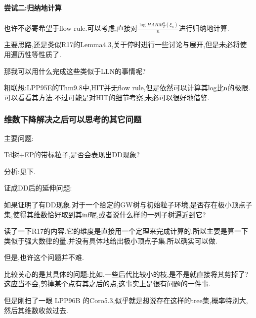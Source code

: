 \documentclass[a4paper,oneside]{ctexbook}
\begin{document}
			\paragraph*{尝试二:归纳地计算}
			\quad %

				也许不必寄希望于flow rule.可以考虑,直接对$\displaystyle\frac{\log HARM^{\eta}_T(\xi_n)}{n}$进行归纳地计算.

				主要思路,还是类似R17的Lemma4.3,关于停时进行一些讨论与展开,但是未必将使用遍历性等性质了.

				那我可以用什么完成这些类似于LLN的事情呢?

				粗联想:LPP95E的Thm9.8中,HIT并无flow rule,但是依然可以计算其log比n的极限.可以看看其方法.不过可能是对HIT的细节考察,未必可以很好地借鉴.

	
						
			\subsubsection*{维数下降解决之后可以思考的其它问题}

				主要问题:

					\begin{que}

						Td树+EP的带标粒子,是否会表现出DD现象?
					
					\end{que}

					分析:见下.					

				证成DD后的延伸问题:

					\begin{que}

						如果证明了有DD现象.对于一个给定的GW树与初始粒子环境,是否存在极小顶点子集,使得其维数恰好取到其inf呢,或者说什么样的一列子树逼近到它?
					
					\end{que}

						读了一下R17的内容.它的维度是直接用一个定理来完成计算的.所以主要是算一下类似于强大数律的量.并没有具体地给出极小顶点子集.所以确实可以做.

						但是,也许这个问题并不难.

						比较关心的是其具体的问题:比如,一些后代比较小的枝,是不是就直接将其剪掉了?这应当不会,剪掉某个点有其之后的点,这事实上是很有问题的一件事.

						但是刚扫了一眼 LPP96B 的Coro5.3,似乎就是想说存在这样的tree集,概率特别大,然后其维数收敛过去.
\end{document}
